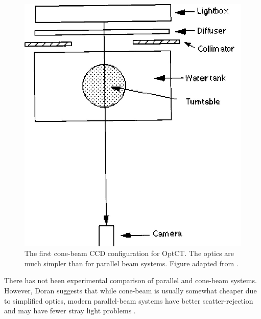 \documentclass[12pt]{article}
\begin{document}
\begin{figure}[H]
\centering
\includegraphics[scale=0.3]{Wolodzko_1999_conesetup.jpg}
\caption{The first cone-beam CCD configuration for OptCT. The optics are much simpler than for parallel beam systems. Figure adapted from \cite{Wolodzko:1999}.}
\end{figure}


There has not been experimental comparison of parallel and cone-beam systems. However,  Doran suggests that while cone-beam is usually somewhat cheaper due to simplified optics, modern parallel-beam systems have better scatter-rejection and may have fewer stray light problems \cite{Doran:2008kh, Olding:2011eta, Thomas:2011eja}.



 

 




\end{document}
